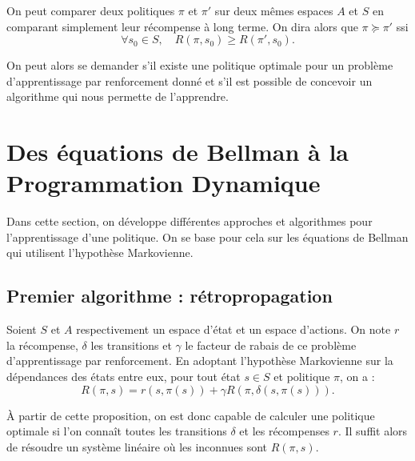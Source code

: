 \begin{proposition}
    On peut comparer deux politiques $ \pi$ et $ \pi'$ sur deux mêmes espaces $A$ et $S$ en comparant simplement leur récompense à long terme. On dira alors que $ \pi \succeq \pi'$ ssi 
    \begin{equation}
        \forall s_0 \in S, \quad R( \pi, s_0) \geqslant R( \pi', s_0). 
    \end{equation}
\end{proposition}

On peut alors se demander s'il existe une politique optimale pour un problème d'apprentissage par renforcement donné et s'il est possible de concevoir un algorithme qui nous permette de l'apprendre. 


\section{Des équations de Bellman à la Programmation Dynamique}

Dans cette section, on développe différentes approches et algorithmes pour l'apprentissage d'une politique. On se base pour cela sur les équations de Bellman qui utilisent l'hypothèse Markovienne. 

\subsection{Premier algorithme : rétropropagation}

\begin{proposition}
    Soient $S$ et $A$ respectivement un espace d'état et un espace d'actions. On note $r$ la récompense, $ \delta$ les transitions et $ \gamma$ le facteur de rabais de ce problème d'apprentissage par renforcement. En adoptant l'hypothèse Markovienne sur la dépendances des états entre eux, pour tout état $s \in S$ et politique $ \pi$, on a : 
    \begin{equation}
        R( \pi, s) = r(s, \pi(s)) + \gamma R( \pi, \delta(s, \pi(s))). 
        \label{eq:recomp-markov}
    \end{equation}
\end{proposition}

À partir de cette proposition, on est donc capable de calculer une politique optimale si l'on connaît toutes les transitions $ \delta$ et les récompenses $r$. Il suffit alors de résoudre un système linéaire où les inconnues sont $ R( \pi, s)$. 


